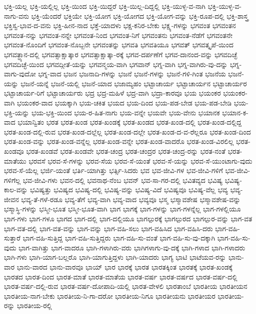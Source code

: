 {ಭಕ್ತಿ-ಯಲ್ಲ
ಭಕ್ತಿ-ಯಲ್ಲಿಲ್ಲ
ಭಕ್ತಿ-ಯಿಂದ
ಭಕ್ತಿ-ಯಿದ್ದರೆ
ಭಕ್ತಿ-ಯಿಲ್ಲ-ದಿದ್ದಲ್ಲಿ
ಭಕ್ತಿ-ಯುಳ್ಳ-ವ-ನಾಗಿ
ಭಕ್ತಿ-ಯುಳ್ಳ-ವ-ನಾಗು-ವನು
ಭಕ್ತಿ-ಯೆಂದರೆ
ಭಕ್ತಿಯೇ
ಭಕ್ತಿ-ಯೋಗ
ಭಕ್ತಿ-ಯೋಗದ
ಭಕ್ತಿ-ಯೋಗ-ವನ್ನು
ಭಕ್ತಿ-ರೂಪ-ದಲ್ಲಿ
ಭಕ್ತಿ-ಶಾಸ್ತ್ರ
ಭಕ್ತಿಸ್ವ-ಭಾವ-ದ-ವನು
ಭಕ್ತಿ-ಹೀನ-ನಾದ
ಭಕ್ತೆ-ಯಾದಳು
ಭಕ್ಷ-ಕನಿರ-ಬೇಕು
ಭಕ್ಷ್ಯ-ಗಳನ್ನು
ಭಗವಂತ
ಭಗವಂತನ
ಭಗವಂತ-ನನ್ನು
ಭಗವಂತ-ನನ್ನೇ
ಭಗವಂತ-ನಿಂದ
ಭಗವಂತ-ನಿಗೆ
ಭಗವಂತನು
ಭಗವಂತ-ನೆಡೆಗೆ
ಭಗವಂತನೇ
ಭಗವಂತ-ನೊಂದಿಗೆ
ಭಗವಂತ-ನೊಬ್ಬನೇ
ಭಗವಂತನ್ನು
ಭಗವತಿ
ಭಗವತಿಯೂ
ಭಗವತ್
ಭಗವತ್ಕೃಪೆ-ಯಿಂದ
ಭಗವತ್ಧ್ಯಾನ-ದಲ್ಲಿ
ಭಗವತ್ಸಾಕ್ಷಾತ್ಕಾರ
ಭಗವತ್ಸಾಕ್ಷಾತ್ಕಾ-ರಕ್ಕೆ
ಭಗವ-ದರ್ಪಣೆಗೆ
ಭಗವ-ದಾನಂದ-ವನ್ನು
ಭಗವದಿಚ್ಛೆ
ಭಗವದಿಚ್ಛೆ-ಯಿಂದ
ಭಗವದ್ಗೀತೆ-ಯನ್ನು
ಭಗವನ್ಮಯ-ವಾಗಿ
ಭಗವಾನ್
ಭಗ್ನ-ವಾಗಿ
ಭಗ್ನ-ವಾಗಿರು-ವು-ದನ್ನು
ಭಗ್ನ-ವಾಗು-ವುದೋ
ಭಗ್ನ-ವಾದ
ಭಜನ
ಭಜನಾದಿ-ಗಳನ್ನು
ಭಜನೆ
ಭಜನೆ-ಗಳನ್ನು
ಭಜನೆ-ಗಳಿ-ಗಿಂತ
ಭಜನೆಯ
ಭಜನೆ-ಯನ್ನು
ಭಜನೆ-ಯನ್ನೆ
ಭಜನೆ-ಯಲ್ಲಿ
ಭಜನೆ-ಯಾದ
ಭಜಾಮ್ಯಹಂ
ಭಟ್ಟಾಚಾರ್ಯ
ಭಟ್ಟಾಚಾರ್ಯನ
ಭಟ್ಟಾಚಾರ್ಯರ
ಭಟ್ಟಾಚಾರ್ಯ-ರಿಗೆ
ಭಟ್ಟಾಚಾರ್ಯರು
ಭದ್ರ
ಭದ್ರ-ಮಹಿಳೆ
ಭದ್ರ-ವಾಗಿ
ಭದ್ರಾ-ಕಾರವೂ
ಭಯ
ಭಯಂಕರ
ಭಯಂಕರ-ವಾಗಿ
ಭಯಂಕರ-ವಾದ
ಭಯಕ್ಕಾಗಿ
ಭಯ-ಚಕಿತ
ಭಯದ
ಭಯ-ದಿಂದ
ಭಯ-ಪಡ-ಬೇಡ
ಭಯ-ಪಡ-ಬೇಡಿ
ಭಯ-ಭಕ್ತಿ-ಯನ್ನು
ಭಯ-ಭಕ್ತಿ-ಯಿಂದ
ಭಯ-ರ-ಹಿತ-ನಾಗು
ಭಯ-ವನ್ನೇ
ಭಯವೇ
ಭಯ-ವೇನು
ಭಯಾನಕ
ಭಯಾನ-ಕ-ವಾದ
ಭಯಾನ್ವಿತಂ
ಭರತ
ಭರತ-ಖಂಡ
ಭರತ-ಖಂಡಕ್ಕೆ
ಭರತ-ಖಂಡದ
ಭರತ-ಖಂಡ-ದಲ್ಲಿ
ಭರತ-ಖಂಡ-ದಲ್ಲಿದ್ದ
ಭರತ-ಖಂಡ-ದಲ್ಲಿ-ರುವ
ಭರತ-ಖಂಡ-ದಲ್ಲೆಲ್ಲ
ಭರತ-ಖಂಡ-ದಲ್ಲೇ
ಭರತ-ಖಂಡ-ದ-ವ-ರೆಲ್ಲರೂ
ಭರತ-ಖಂಡ-ದಿಂದ
ಭರತ-ಖಂಡ-ವನ್ನು
ಭರತ-ಖಂಡ-ವನ್ನೆಲ್ಲ
ಭರತ-ಖಂಡ-ವನ್ನೇ
ಭರತ-ಖಂಡ-ವಾದರೊ
ಭರತ-ಖಂಡ-ವಿರಲಿಲ್ಲ
ಭರತ-ಖಂಡವೂ
ಭರತ-ಖಂಡವೆ
ಭರತ-ಖಂಡವೇ
ಭರತ-ಚಂದ್ರ
ಭರತ-ಚಂದ್ರರ
ಭರತ-ಚಂದ್ರ-ರನ್ನು
ಭರತ-ನಂತೆ
ಭರತ-ಮಾತೆಯು
ಭರವಸೆ
ಭರವ-ಸೆ-ಗಳನ್ನು
ಭರವ-ಸೆಯ
ಭರವ-ಸೆ-ಯಂತೆ
ಭರವ-ಸೆ-ಯನ್ನು
ಭರವ-ಸೆ-ಯುಂಟಾಗು-ವುದು
ಭರವ-ಸೆ-ಯೆಲ್ಲ
ಭರ್ಜಿ-ಯಂತೆ
ಭರ್ತಿ-ಯಾಗಿತ್ತು
ಭರ್ತ್ಸಿ-ಸಿದರು
ಭವ
ಭವ-ಜೀವಿ-ಗಳ
ಭವ-ಜೀವಿ-ಗಳಿಗೆ
ಭವ-ಜೀವಿ-ಗಳಿಗೆಲ್ಲ
ಭವ-ಜೀವಿ-ಗಳು
ಭವನ-ದಲ್ಲಿ
ಭವನಾಥ-ನೆಂಬ
ಭವನ್
ಭವ-ಸಾ-ಗರ-ದಲ್ಲಿ
ಭವಿತವ್ಯದ
ಭವಿಷ್ಯ
ಭವಿಷ್ಯ-ಕಾಲ-ವನ್ನು
ಭವಿಷ್ಯತ್ತು
ಭವಿಷ್ಯದ
ಭವಿಷ್ಯ-ದಲ್ಲಿ
ಭವಿಷ್ಯ-ವನ್ನು
ಭವಿಷ್ಯ-ವಿದೆ
ಭವಿಷ್ಯವೂ
ಭವಿಷ್ಯ-ವೆಲ್ಲ
ಭವ್ಯ
ಭವ್ಯ-ಜೀವನ
ಭವ್ಯ-ತೆ-ಗಳೆ-ರಡೂ
ಭವ್ಯ-ತೆಗೆ
ಭವ್ಯ-ವಾಗಿ
ಭವ್ಯ-ವಾದ
ಭವ್ಯವೂ
ಭಸ್ಮ
ಭಸ್ಮಾವಶೇಷ
ಭಸ್ಮಾವಶೇಷ-ವನ್ನು
ಭಸ್ಮಾಸ್ಥಿ-ಗಳನ್ನು
ಭಸ್ಮೀ-ಭೂತ
ಭಸ್ಮೀ-ಭೂತ-ವಾಗಿ
ಭಾಗ
ಭಾಗಕ್ಕೆ
ಭಾಗ-ಗಳನ್ನು
ಭಾಗ-ಗಳನ್ನೆಲ್ಲ
ಭಾಗ-ಗಳಲ್ಲಿಯೂ
ಭಾಗ-ಗಳು
ಭಾಗ-ಗಳೂ
ಭಾಗದ
ಭಾಗ-ದಲ್ಲಿ
ಭಾಗ-ದಲ್ಲಿಯೂ
ಭಾಗಲ್ಪುರಕ್ಕೆ
ಭಾಗಲ್ಪುರದ
ಭಾಗಲ್ಪುರ-ವನ್ನು
ಭಾಗ-ವತ
ಭಾಗ-ವತ-ದಲ್ಲಿ
ಭಾಗ-ವತ-ವನ್ನು
ಭಾಗ-ವನ್ನು
ಭಾಗ-ವಹಿ-ಸಲು
ಭಾಗ-ವಹಿಸಿದ
ಭಾಗ-ವಹಿಸಿ-ದರು
ಭಾಗ-ವಹಿ-ಸುತ್ತಾರೆ
ಭಾಗ-ವಹಿ-ಸುತ್ತಿದ್ದ
ಭಾಗ-ವಹಿ-ಸುತ್ತಿದ್ದರು
ಭಾಗ-ವಹಿ-ಸು-ವಂತೆ
ಭಾಗ-ವಹಿ-ಸು-ವು-ದಕ್ಕಾಗಿ
ಭಾಗ-ವಹಿ-ಸು-ವುದು
ಭಾಗ-ವಾಗಿತ್ತು
ಭಾಗ-ವಾದರೂ
ಭಾಗಿ-ಗಳಾಗಿರು-ವರು
ಭಾಗಿಗಳಾಗು-ವು-ದಕ್ಕೆ
ಭಾಗಿ-ಗಳಾದ
ಭಾಗಿ-ಗಳಾದರು
ಭಾಗಿ-ಗಳು
ಭಾಗಿ-ಯಾಗ-ಬಲ್ಲರೊ
ಭಾಗಿ-ಯಾಗುತ್ತಿದ್ದಳು
ಭಾಗಿ-ಯಾದರು
ಭಾಗ್ಯ
ಭಾಟಿ
ಭಾಟೆಯವ-ರನ್ನು
ಭಾನು-ವಾರ
ಭಾನು-ವಾರದ
ಭಾನು-ವಾರವೂ
ಭಾಯ್
ಭಾರ
ಭಾರಕ್ಕೆ
ಭಾರತ
ಭಾರತಕ್ಕಿಂತ
ಭಾರತಕ್ಕೆ
ಭಾರತ-ಖಂಡಕ್ಕೆ
ಭಾರತದ
ಭಾರತ-ದಿಂದ
ಭಾರತ-ಮಾತೆ
ಭಾರತ-ಮಾತೆಯ
ಭಾರತ-ವರ್ಷ
ಭಾರತ-ವರ್ಷದ
ಭಾರತ-ವರ್ಷ-ದಲ್ಲಿ
ಭಾರತ-ವರ್ಷ-ದಲ್ಲಿ-ರುವ
ಭಾರತ-ವರ್ಷ-ದೋಪಾದಿ-ಯಲ್ಲಿ
ಭಾರತ-ವೇಳಲಿ
ಭಾರತಾಂಬೆ
ಭಾರತೀಯ
ಭಾರತೀಯನ
ಭಾರತೀಯ-ನಾಗ-ಬೇಕು
ಭಾರತೀಯ-ನಿ-ಗಾ-ದರೋ
ಭಾರತೀಯ-ನಿಗೂ
ಭಾರತೀಯನು
ಭಾರತೀಯರ
ಭಾರತೀಯ-ರನ್ನು
ಭಾರತೀಯ-ರಲ್ಲಿ
}
